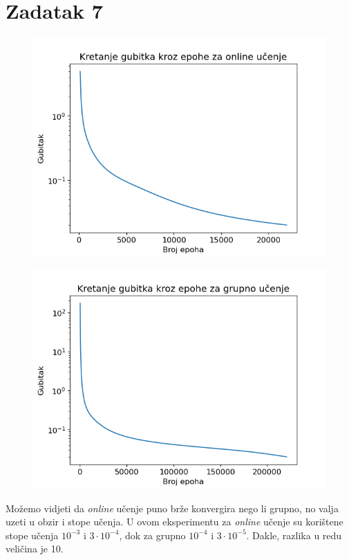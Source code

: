 \documentclass[times, utf8, seminar]{fer}
\begin{document}
\chapter{Zadatak 7}
\begin{figure}[H]
    \centering
    \includegraphics[scale=0.5]{img/loss-online.png}
    \caption{}
\end{figure}
\begin{figure}[H]
    \centering
    \includegraphics[scale=0.5]{img/loss-grupno.png}
    \caption{}
\end{figure}
Možemo vidjeti da \textit{online} učenje puno brže konvergira nego li grupno, no valja uzeti u obzir i stope učenja. U ovom eksperimentu za \textit{online} učenje su korištene stope učenja $10^{-3}$ i $3\cdot10^{-4}$, dok za grupno $10^{-4}$ i $3\cdot10^{-5}$. Dakle, razlika u redu veličina je 10.
\end{document}
